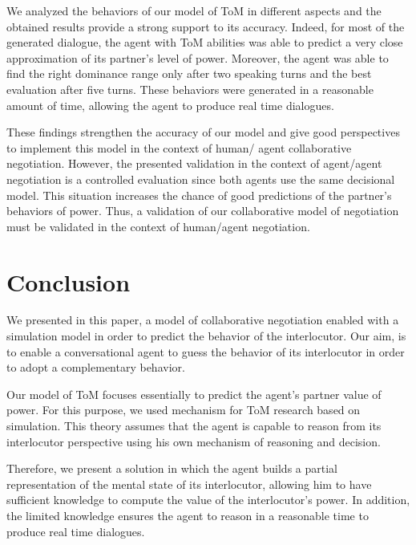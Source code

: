 \documentclass[conference, letterpaper]{IEEEtran}
\begin{document}
	We analyzed the behaviors of our model of ToM in different aspects and the obtained results provide a strong support to its accuracy. Indeed, for most of the generated dialogue, the agent with ToM abilities was able to predict a very close approximation of its partner's level of power. Moreover, the agent was able to find the right dominance range only after two speaking turns and the best evaluation after five turns. These behaviors were generated in a reasonable amount of time, allowing the agent to produce real time dialogues.
	
	These findings strengthen the accuracy of our model and give good perspectives to implement this model in the context of human/ agent collaborative negotiation. However, the presented validation in the context of agent/agent negotiation is a controlled evaluation since both agents use the same decisional model. This situation increases the chance of good predictions of the partner's behaviors of power. 	
	Thus, a validation of our collaborative model of negotiation must be validated in the context of human/agent negotiation.

	\section{Conclusion}
	We presented in this paper, a model of collaborative negotiation enabled with a simulation model in order to predict the behavior of the interlocutor. Our aim, is to enable a conversational agent to guess the behavior of its interlocutor in order to adopt a complementary behavior.
	
	 Our model of ToM focuses essentially to predict the agent's partner value of power. For this purpose, we used mechanism for ToM research based on simulation. This theory assumes that the agent is capable to reason from its interlocutor perspective using his own mechanism of  reasoning and decision.
	  
	Therefore, we present a solution in which the agent builds a partial representation of the mental state of its interlocutor, allowing him to have sufficient knowledge to compute the value of the interlocutor's power. In addition, the limited knowledge ensures the agent to reason in a reasonable time to produce real time dialogues.
	
\end{document}
